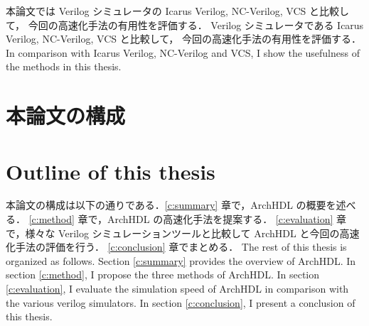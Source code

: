 本論文では Verilog シミュレータの Icarus Verilog, NC-Verilog, VCS と比較して，
今回の高速化手法の有用性を評価する．
Verilog シミュレータである Icarus Verilog, NC-Verilog, VCS と比較して，
今回の高速化手法の有用性を評価する．
\fi
In comparison with Icarus Verilog, NC-Verilog and VCS, I show the usefulness of the methods in this thesis.

\section{本論文の構成}
\fi
\section{Outline of this thesis}

本論文の構成は以下の通りである．\ref{c:summary} 章で，ArchHDL の概要を述べる．
\ref{c:method} 章で，ArchHDL の高速化手法を提案する．
\ref{c:evaluation} 章で，様々な Verilog シミュレーションツールと比較して ArchHDL と今回の高速化手法の評価を行う．
\ref{c:conclusion} 章でまとめる．
\fi
The rest of this thesis is organized as follows.
Section \ref{c:summary} provides the overview of ArchHDL.
In section \ref{c:method}, I propose the three methods of ArchHDL.
In section \ref{c:evaluation}, I evaluate the simulation speed of ArchHDL in comparison with the various verilog simulators.
In section \ref{c:conclusion}, I present a conclusion of this thesis.
